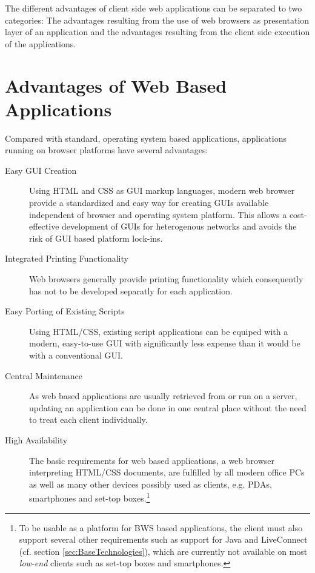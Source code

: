 The different advantages of client side web applications can be separated to two categories: 
The advantages resulting from the use of web browsers as presentation layer of an application and the advantages resulting from the client side execution of the applications.


\section{Advantages of Web Based Applications}

Compared with standard, operating system based applications, applications running on browser platforms have several advantages:

\begin{description}

	\item[Easy GUI Creation] Using HTML and CSS as GUI markup languages, modern web browser provide a standardized and easy way for creating GUIs available independent of browser and operating system platform. This allows a cost-effective development of GUIs for heterogenous networks and avoids the risk of GUI based platform lock-ins.
	
	\item[Integrated Printing Functionality] Web browsers generally provide printing functionality which consequently has not to be developed separatly for each application.
	
	\item[Easy Porting of Existing Scripts] Using HTML/CSS, existing script applications can be equiped with a modern, easy-to-use GUI with significantly less expense than it would be with a conventional GUI.
	
	\item[Central Maintenance] As web based applications are usually retrieved from or run on a server, updating an application can be done in one central place without the need to treat each client individually.
	
	\item[High Availability] The basic requirements for web based applications, a web browser interpreting HTML/CSS documents, are fulfilled by all modern office PCs as well as many other devices possibly used as clients, e.g. PDAs, smartphones and set-top boxes.\footnote{To be usable as a platform for BWS based applications, the client must also support several other requirements such as support for Java and LiveConnect (cf. section \ref{sec:BaseTechnologies}), which are currently not available on most \emph{low-end} clients such as set-top boxes and smartphones.}
	

\end{description}
